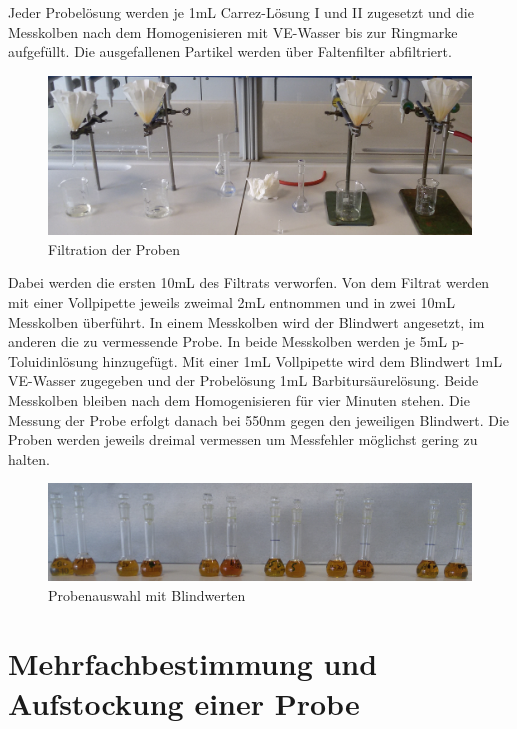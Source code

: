 Jeder Probelösung werden je 1mL Carrez-Lösung I und II zugesetzt und die Messkolben nach dem Homogenisieren mit VE-Wasser bis zur Ringmarke aufgefüllt. Die ausgefallenen Partikel werden über Faltenfilter abfiltriert. \\
\begin{figure}[htbp]
	\centering
		\includegraphics[width=1.00\textwidth]{../Bilder/20150427_131648.jpg}
	\caption{Filtration der Proben}
	\label{fig:Filtration}
\end{figure}
Dabei werden die ersten 10mL des Filtrats verworfen. Von dem Filtrat werden mit einer Vollpipette jeweils zweimal 2mL entnommen und in zwei 10mL Messkolben überführt. In einem Messkolben wird der Blindwert angesetzt, im anderen die zu vermessende Probe. In beide Messkolben werden je 5mL p-Toluidinlösung hinzugefügt. Mit einer 1mL Vollpipette wird dem Blindwert 1mL VE-Wasser zugegeben und der Probelösung 1mL Barbitursäurelösung. Beide Messkolben bleiben nach dem Homogenisieren für vier Minuten stehen. Die Messung der Probe erfolgt danach bei 550nm gegen den jeweiligen Blindwert. Die Proben werden jeweils dreimal vermessen um Messfehler möglichst gering zu halten.
\begin{figure}[htbp]
	\centering
		\includegraphics[width=1.00\textwidth]{../Bilder/20150427_140221(0).jpg}
	\caption{Probenauswahl mit Blindwerten}
	\label{fig:Probenauswahl}
\end{figure}

\newpage
\section{Mehrfachbestimmung und Aufstockung einer Probe}


